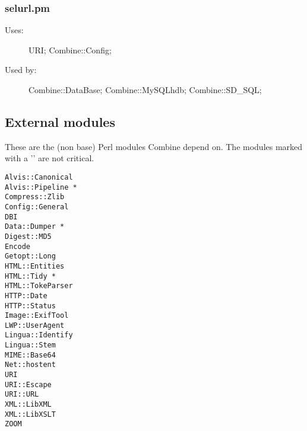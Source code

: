 \subsubsection{selurl.pm}
\begin{description}
\item[Uses:] URI; Combine::Config; 

\item[Used by:] Combine::DataBase; Combine::MySQLhdb; Combine::SD\_SQL; 

\end{description}
\subsection{External modules}
\label{extmods}
These are the (non base) Perl modules Combine depend on.
The modules marked with a '{\tt *}' are not critical.
\begin{verbatim}
Alvis::Canonical
Alvis::Pipeline *
Compress::Zlib
Config::General
DBI
Data::Dumper *
Digest::MD5
Encode
Getopt::Long
HTML::Entities
HTML::Tidy *
HTML::TokeParser
HTTP::Date
HTTP::Status
Image::ExifTool
LWP::UserAgent
Lingua::Identify
Lingua::Stem
MIME::Base64
Net::hostent
URI
URI::Escape
URI::URL
XML::LibXML
XML::LibXSLT
ZOOM
\end{verbatim}
